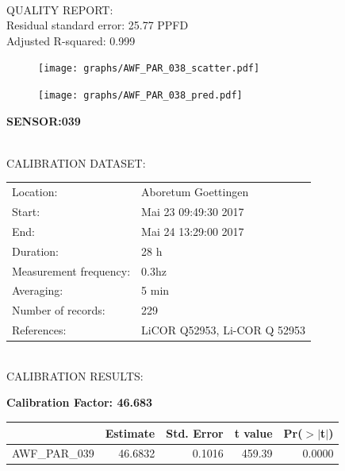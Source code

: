 \documentclass[oneside]{report}
\begin{document}
\hrulefill\\
QUALITY REPORT:\\
Residual standard error: 25.77 PPFD\\
Adjusted R-squared: 0.999



\begin{figure}[H]
  \centering
  \texttt{[image: graphs/AWF\_PAR\_038\_scatter.pdf]}
\end{figure}




\begin{figure}[H]
  \centering
  \texttt{[image: graphs/AWF\_PAR\_038\_pred.pdf]}
\end{figure}

\pagebreak


\begin{center}
\large{\textbf{SENSOR:039}}\\
\end{center}

\hrulefill\\
CALIBRATION DATASET:\\
\begin{table}[h!]
  \centering
  \label{tab:table1}
  \begin{tabular}{ll}
    Location: & Aboretum Goettingen\\ 
    
    
    Start:  & Mai 23 09:49:30 2017 \\
    End:   & Mai 24 13:29:00 2017\\ 
    Duration: & 28 h\\
    Measurement frequency: & 0.3hz\\
    Averaging:  &5 min\\
    Number of records: & 229 \\
    References: & LiCOR Q52953, Li-COR Q 52953 \\
  \end{tabular}
\end{table}

\hrulefill\\
CALIBRATION RESULTS:\\


\begin{center}
\textbf{\large{Calibration Factor: 46.683}}\\
\end{center}
\begin{table}[ht]
\centering
\begin{tabular}{rrrrr}
  \hline
 & Estimate & Std. Error & t value & Pr($>$$|$t$|$) \\ 
  \hline
AWF\_PAR\_039 & 46.6832 & 0.1016 & 459.39 & 0.0000 \\ 
   \hline
\end{tabular}
\end{table}
\end{document}
